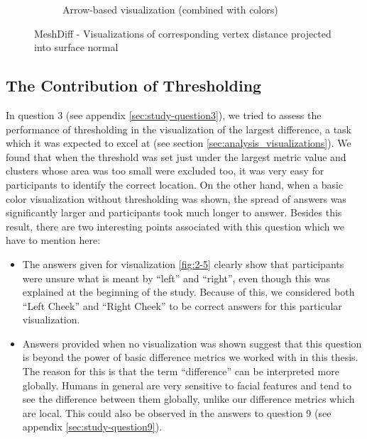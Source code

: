 \begin{figure}[h]
\begin{subfigure}{0.4\textwidth}
		\caption{Arrow-based visualization (combined with colors)}
		\label{fig:cloudcompare_example}
	\end{subfigure}
	\caption[MeshDiff - Absolute metric value visualizations]{MeshDiff - Visualizations of corresponding vertex distance projected into surface normal}
	\label{fig:discussion-normal_projected}
\end{figure}

\subsection{The Contribution of Thresholding}
\label{sec:discussion-thresholding}

In question 3 (see appendix \ref{sec:study-question3}), we tried to assess the performance of thresholding in the visualization of the largest difference, a task which it was expected to excel at (see section \ref{sec:analysis_visualizations}). We found that when the threshold was set just under the largest metric value and clusters whose area was too small were excluded too\footnotemark, it was very easy for participants to identify the correct location. On the other hand, when a basic color visualization without thresholding was shown, the spread of answers was significantly larger and participants took much longer to answer. Besides this result, there are two interesting points associated with this question which we have to mention here:


\begin{itemize}
	\item The answers given for visualization \ref{fig:2-5} clearly show that participants were unsure what is meant by ``left'' and ``right'', even though this was explained at the beginning of the study. Because of this, we considered both ``Left Cheek'' and ``Right Cheek'' to be correct answers for this particular visualization.
	\item Answers provided when no visualization was shown suggest that this question is beyond the power of basic difference metrics we worked with in this thesis. The reason for this is that the term ``difference'' can be interpreted more globally. Humans in general are very sensitive to facial features and tend to see the difference between them globally, unlike our difference metrics which are local. This could also be observed in the answers to question 9 (see appendix \ref{sec:study-question9}).
\end{itemize}

